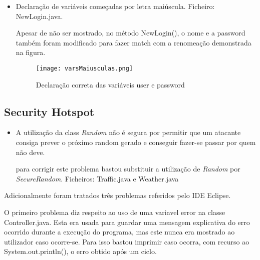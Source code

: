 \begin{itemize}
\item Declaração de variáveis começadas por letra maiúscula. \newline
 Ficheiro: NewLogin.java.\newline

\par Apesar de não ser mostrado, no método NewLogin(), o nome e a password também foram modificado para fazer match com a renomeação demonstrada na figura.

\begin{figure}[H]

  \centering

  \texttt{[image: varsMaiusculas.png]}

  \caption {Declaração correta das variáveis user e password}

  \label {fig27}

\end{figure}

\end{itemize}

\subsection{Security Hotspot}

\begin{itemize}

\item A utilização da class \textit{Random} não é segura por permitir que um atacante consiga prever o próximo random gerado e conseguir fazer-se passar por quem não deve.\newline

\par para corrigir este problema bastou substituir a utilização de \textit{Random} por \textit{SecureRandom}.
Ficheiros: Traffic.java e Weather.java

\end{itemize}

\par Adicionalmente foram tratados três problemas referidos pelo IDE Eclipse.

\par O primeiro problema diz respeito ao uso de uma variavel error na classe Controller.java. Esta era usada para guardar uma mensagem explicativa do erro ocorrido durante a execução do programa, mas este nunca era mostrado ao utilizador caso ocorre-se. Para isso bastou imprimir caso ocorra, com recurso ao System.out.println(), o erro obtido após um ciclo.\newline

